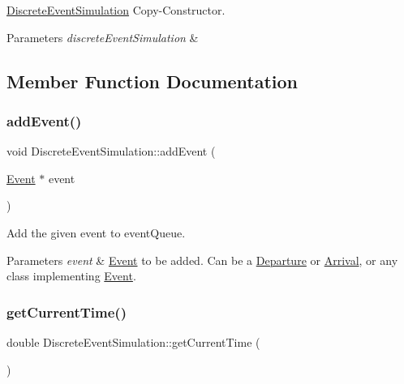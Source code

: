 \hyperlink{classDiscreteEventSimulation}{Discrete\+Event\+Simulation} Copy-\/\+Constructor. 
\begin{DoxyParams}{Parameters}
{\em discrete\+Event\+Simulation} & \\
\hline
\end{DoxyParams}


\subsection{Member Function Documentation}
\mbox{\label{classDiscreteEventSimulation_a03770d2464931bc3555d4f34379aaa1e}} 
\subsubsection{\texorpdfstring{add\+Event()}{addEvent()}}
{\footnotesize\ttfamily void Discrete\+Event\+Simulation\+::add\+Event (\begin{DoxyParamCaption}\item[{\hyperlink{classEvent}{Event} $\ast$}]{event }\end{DoxyParamCaption})}

Add the given event to event\+Queue. 
\begin{DoxyParams}{Parameters}
{\em event} & \hyperlink{classEvent}{Event} to be added. Can be a \hyperlink{classDeparture}{Departure} or \hyperlink{classArrival}{Arrival}, or any class implementing \hyperlink{classEvent}{Event}. \\
\hline
\end{DoxyParams}
\mbox{\label{classDiscreteEventSimulation_a41c5492fdf2d5ef2a9a27200871caabd}} 
\subsubsection{\texorpdfstring{get\+Current\+Time()}{getCurrentTime()}}
{\footnotesize\ttfamily double Discrete\+Event\+Simulation\+::get\+Current\+Time (\begin{DoxyParamCaption}{ }\end{DoxyParamCaption})}

